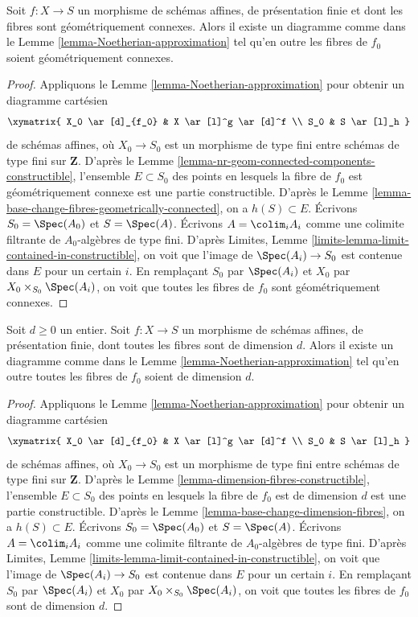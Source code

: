 \begin{lemma}
\label{lemma-Noetherian-approximation-geometrically-connected}
Soit $f : X \to S$ un morphisme de schémas affines, de
présentation finie et dont les fibres sont géométriquement connexes.
Alors il existe un diagramme comme dans le
Lemme \ref{lemma-Noetherian-approximation}
tel qu'en outre les fibres de $f_0$ soient géométriquement connexes.
\end{lemma}

\begin{proof}
Appliquons le
Lemme \ref{lemma-Noetherian-approximation}
pour obtenir un diagramme cartésien
$$
\xymatrix{
X_0 \ar[d]_{f_0} & X \ar[l]^g \ar[d]^f \\
S_0 & S \ar[l]_h
}
$$
de schémas affines, où $X_0 \to S_0$ est un morphisme de type fini entre
schémas de type fini sur $\mathbf{Z}$. D'après le
Lemme \ref{lemma-nr-geom-connected-components-constructible},
l'ensemble $E \subset S_0$ des points en lesquels la fibre de
$f_0$ est géométriquement connexe est une partie constructible. D'après le
Lemme \ref{lemma-base-change-fibres-geometrically-connected},
on a $h(S) \subset E$. Écrivons $S_0 = \Spec(A_0)$ et
$S = \Spec(A)$. Écrivons $A = \colim_i A_i$ comme une
colimite filtrante de $A_0$-algèbres de type fini. D'après
Limites, Lemme \ref{limits-lemma-limit-contained-in-constructible},
on voit que l'image de $\Spec(A_i) \to S_0$ est contenue dans $E$
pour un certain $i$. En remplaçant $S_0$ par $\Spec(A_i)$ et
$X_0$ par $X_0 \times_{S_0} \Spec(A_i)$, on voit que
toutes les fibres de $f_0$ sont géométriquement connexes.
\end{proof}

\begin{lemma}
\label{lemma-Noetherian-approximation-dimension-d}
Soit $d \geq 0$ un entier.
Soit $f : X \to S$ un morphisme de schémas affines, de
présentation finie, dont toutes les fibres sont de dimension $d$.
Alors il existe un diagramme comme dans le
Lemme \ref{lemma-Noetherian-approximation}
tel qu'en outre toutes les fibres de $f_0$ soient de dimension $d$.
\end{lemma}

\begin{proof}
Appliquons le
Lemme \ref{lemma-Noetherian-approximation}
pour obtenir un diagramme cartésien
$$
\xymatrix{
X_0 \ar[d]_{f_0} & X \ar[l]^g \ar[d]^f \\
S_0 & S \ar[l]_h
}
$$
de schémas affines, où $X_0 \to S_0$ est un morphisme de type fini entre
schémas de type fini sur $\mathbf{Z}$. D'après le
Lemme \ref{lemma-dimension-fibres-constructible},
l'ensemble $E \subset S_0$ des points en lesquels la fibre de
$f_0$ est de dimension $d$ est une partie constructible. D'après le
Lemme \ref{lemma-base-change-dimension-fibres},
on a $h(S) \subset E$. Écrivons $S_0 = \Spec(A_0)$ et
$S = \Spec(A)$. Écrivons $A = \colim_i A_i$ comme une
colimite filtrante de $A_0$-algèbres de type fini. D'après
Limites, Lemme \ref{limits-lemma-limit-contained-in-constructible},
on voit que l'image de $\Spec(A_i) \to S_0$ est contenue dans $E$
pour un certain $i$. En remplaçant $S_0$ par $\Spec(A_i)$ et
$X_0$ par $X_0 \times_{S_0} \Spec(A_i)$, on voit que
toutes les fibres de $f_0$ sont de dimension $d$.
\end{proof}

